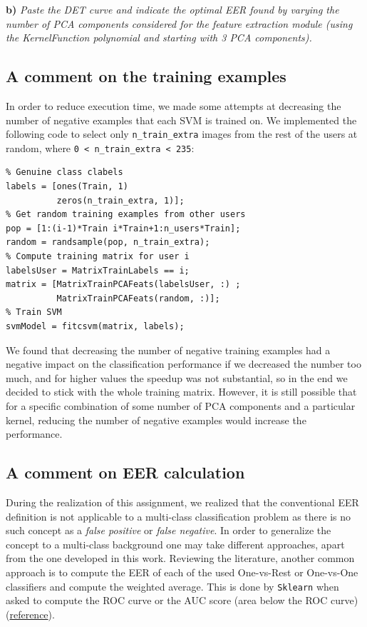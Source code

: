 \documentclass[11pt]{article}
\begin{document}
\textbf{b)} \textit{Paste the DET curve and indicate the optimal EER found by varying the number of PCA components considered for the feature extraction module (using the KernelFunction polynomial and starting with 3 PCA components).}


\subsection*{A comment on the training examples}

In order to reduce execution time, we made some attempts at decreasing the number of negative examples that each SVM is trained on. We implemented the following code to select only \verb|n_train_extra| images from the rest of the users at random, where \verb|0 < n_train_extra < 235|:
\begin{verbatim}
% Genuine class clabels
labels = [ones(Train, 1)
          zeros(n_train_extra, 1)];
% Get random training examples from other users
pop = [1:(i-1)*Train i*Train+1:n_users*Train];
random = randsample(pop, n_train_extra);
% Compute training matrix for user i
labelsUser = MatrixTrainLabels == i;
matrix = [MatrixTrainPCAFeats(labelsUser, :) ;
          MatrixTrainPCAFeats(random, :)];
% Train SVM
svmModel = fitcsvm(matrix, labels);
\end{verbatim}

We found that decreasing the number of negative training examples had a negative impact on the classification performance if we decreased the number too much, and for higher values the speedup was not substantial, so in the end we decided to stick with the whole training matrix. However, it is still possible that for a specific combination of some number of PCA components and a particular kernel, reducing the number of negative examples would increase the performance.

\subsection*{A comment on EER calculation}

During the realization of this assignment, we realized that the conventional EER definition is not applicable to a multi-class classification problem as there is no such concept as a \textit{false positive} or \textit{false negative}. In order to generalize the concept to a multi-class background one may take different approaches, apart from the one developed in this work. Reviewing the literature, another common approach is to compute the EER of each of the used One-vs-Rest or One-vs-One classifiers and compute the weighted average. This is done by \texttt{Sklearn} when asked to compute the ROC curve or the AUC score (area below the ROC curve) (\href{https://scikit-learn.org/stable/auto_examples/model_selection/plot_roc.html}{reference}).
\end{document}
